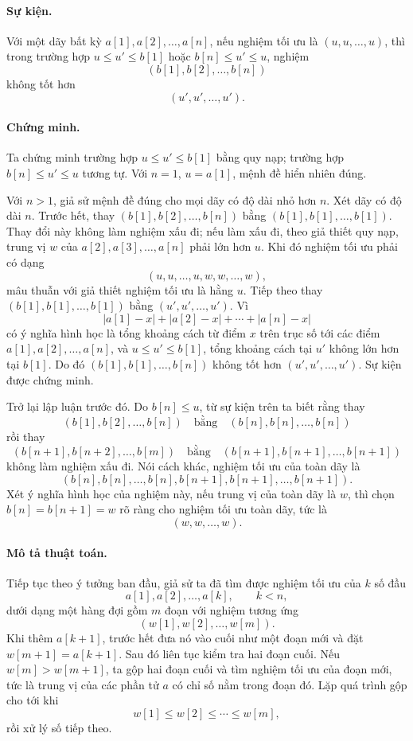 \documentclass[11pt]{article}
\begin{document}
\paragraph{Sự kiện.}
Với một dãy bất kỳ \(a[1],a[2],\ldots,a[n]\), nếu nghiệm tối ưu là
\((u,u,\ldots,u)\), thì trong trường hợp \(u\le u'\le b[1]\) hoặc
\(b[n]\le u'\le u\), nghiệm
\[
  (b[1],b[2],\ldots,b[n])
\]
không tốt hơn
\[
  (u',u',\ldots,u').
\]

\paragraph{Chứng minh.}
Ta chứng minh trường hợp \(u\le u'\le b[1]\) bằng quy nạp; trường hợp
\(b[n]\le u'\le u\) tương tự. Với \(n=1\), \(u=a[1]\), mệnh đề hiển nhiên đúng.

Với \(n>1\), giả sử mệnh đề đúng cho mọi dãy có độ dài nhỏ hơn \(n\). Xét dãy
có độ dài \(n\). Trước hết, thay \((b[1],b[2],\ldots,b[n])\) bằng
\((b[1],b[1],\ldots,b[1])\). Thay đổi này không làm nghiệm xấu đi; nếu làm xấu
đi, theo giả thiết quy nạp, trung vị \(w\) của \(a[2],a[3],\ldots,a[n]\) phải
lớn hơn \(u\). Khi đó nghiệm tối ưu phải có dạng
\[
  (u,u,\ldots,u,w,w,\ldots,w),
\]
mâu thuẫn với giả thiết nghiệm tối ưu là hằng \(u\). Tiếp theo thay
\((b[1],b[1],\ldots,b[1])\) bằng \((u',u',\ldots,u')\). Vì
\[
  |a[1]-x|+|a[2]-x|+\cdots+|a[n]-x|
\]
có ý nghĩa hình học là tổng khoảng cách từ điểm \(x\) trên trục số tới các điểm
\(a[1],a[2],\ldots,a[n]\), và \(u\le u'\le b[1]\), tổng khoảng cách tại \(u'\)
không lớn hơn tại \(b[1]\). Do đó \((b[1],b[1],\ldots,b[n])\) không tốt hơn
\((u',u',\ldots,u')\). Sự kiện được chứng minh.

Trở lại lập luận trước đó. Do \(b[n]\le u\), từ sự kiện trên ta biết rằng thay
\[
  (b[1],b[2],\ldots,b[n])
  \quad\text{bằng}\quad
  (b[n],b[n],\ldots,b[n])
\]
rồi thay
\[
  (b[n+1],b[n+2],\ldots,b[m])
  \quad\text{bằng}\quad
  (b[n+1],b[n+1],\ldots,b[n+1])
\]
không làm nghiệm xấu đi. Nói cách khác, nghiệm tối ưu của toàn dãy là
\[
  (b[n],b[n],\ldots,b[n],b[n+1],b[n+1],\ldots,b[n+1]).
\]
Xét ý nghĩa hình học của nghiệm này, nếu trung vị của toàn dãy là \(w\), thì
chọn \(b[n]=b[n+1]=w\) rõ ràng cho nghiệm tối ưu toàn dãy, tức là
\[
  (w,w,\ldots,w).
\]

\paragraph{Mô tả thuật toán.}
Tiếp tục theo ý tưởng ban đầu, giả sử ta đã tìm được nghiệm tối ưu của
\(k\) số đầu
\[
  a[1],a[2],\ldots,a[k],\qquad k<n,
\]
dưới dạng một hàng đợi gồm \(m\) đoạn với nghiệm tương ứng
\[
  (w[1],w[2],\ldots,w[m]).
\]
Khi thêm \(a[k+1]\), trước hết đưa nó vào cuối như một đoạn mới và đặt
\(w[m+1]=a[k+1]\). Sau đó liên tục kiểm tra hai đoạn cuối. Nếu
\(w[m]>w[m+1]\), ta gộp hai đoạn cuối và tìm nghiệm tối ưu của đoạn mới, tức là
trung vị của các phần tử \(a\) có chỉ số nằm trong đoạn đó. Lặp quá trình gộp
cho tới khi
\[
  w[1]\le w[2]\le\cdots\le w[m],
\]
rồi xử lý số tiếp theo.
\end{document}
